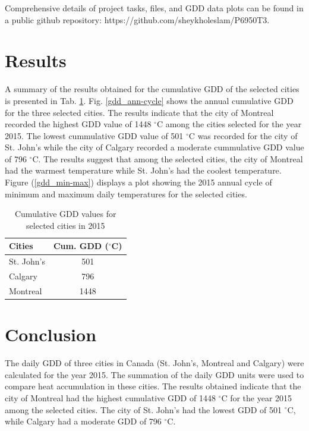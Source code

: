 \documentclass{article}
\begin{document}
Comprehensive details of project tasks, files, and GDD data plots can be found in a public github repository: https://github.com/sheykholeslam/P6950T3. 


\section{ \bf Results}
A summary of the results obtained for the cumulative GDD of the selected cities is presented in Tab. \ref{tbl:gdd-results}. Fig. \ref{gdd_ann-cycle} shows the annual cumulative GDD for the three selected cities. The results indicate that the city of Montreal recorded the highest GDD value of 1448 $^{\circ}$C among the cities selected for the year 2015. The lowest cummulative GDD value of 501 $^{\circ}$C was recorded for the city of St. John's while the city of Calgary recorded a moderate cummulative GDD value of 796 $^{\circ}$C. The results suggest that among the selected cities, the city of Montreal had the warmest temperature while St. John's had the coolest temperature. Figure (\ref{gdd_min-max}) displays a plot showing the 2015 annual cycle of minimum and maximum daily temperatures for the selected cities.

\begin{table}[h]
\caption{Cumulative GDD values for selected cities in 2015} 
\label{tbl:gdd-results}
\centering 
\begin{tabular}{l c}
\hline
\textbf{Cities} & \textbf{Cum. GDD} \textbf($^{\circ}$C) \\
\hline
St. John's & 501 \\
Calgary & 796 \\
Montreal & 1448 \\
\hline
\end{tabular}
\end{table}


\section{Conclusion}
The daily GDD of three cities in Canada (St. John's, Montreal and Calgary) were calculated for the year 2015. The summation of the daily GDD units were used to compare heat accumulation in these cities. The results obtained indicate that the city of Montreal had the highest cumulative GDD of 1448 $^{\circ}$C for the year 2015 among the selected cities. The city of St. John's had the lowest GDD of 501 $^{\circ}$C, while Calgary had a moderate GDD of 796 $^{\circ}$C.
\end{document}
